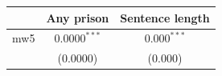 \begin{tabular}{lcc}
\toprule
 & Any prison & Sentence length \\
\midrule
mw5 & \(0.0000^{***}\) & \(0.000^{***}\) \\
 & (0.0000) & (0.000) \\
\bottomrule
\end{tabular}
